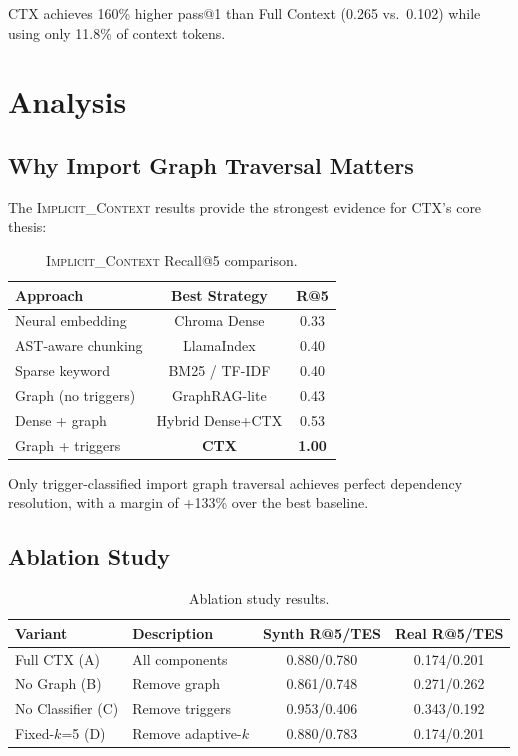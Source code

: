 \documentclass[11pt]{article}
\begin{document}
CTX achieves 160\% higher pass@1 than Full Context (0.265 vs.\ 0.102) while using only 11.8\% of context tokens.

\section{Analysis}

\subsection{Why Import Graph Traversal Matters}

The \textsc{Implicit\_Context} results provide the strongest evidence for CTX's core thesis:

\begin{table}[t]
\centering
\small
\caption{\textsc{Implicit\_Context} Recall@5 comparison.}
\label{tab:implicit}
\begin{tabular}{@{}lcc@{}}
\toprule
\textbf{Approach} & \textbf{Best Strategy} & \textbf{R@5} \\
\midrule
Neural embedding & Chroma Dense & 0.33 \\
AST-aware chunking & LlamaIndex & 0.40 \\
Sparse keyword & BM25 / TF-IDF & 0.40 \\
Graph (no triggers) & GraphRAG-lite & 0.43 \\
Dense + graph & Hybrid Dense+CTX & 0.53 \\
Graph + triggers & \textbf{CTX} & \textbf{1.00} \\
\bottomrule
\end{tabular}
\end{table}

Only trigger-classified import graph traversal achieves perfect dependency resolution, with a margin of +133\% over the best baseline.

\subsection{Ablation Study}
\label{sec:ablation}

\begin{table}[t]
\centering
\small
\caption{Ablation study results.}
\label{tab:ablation}
\begin{tabular}{@{}llcc@{}}
\toprule
\textbf{Variant} & \textbf{Description} & \textbf{Synth R@5/TES} & \textbf{Real R@5/TES} \\
\midrule
Full CTX (A) & All components & 0.880/0.780 & 0.174/0.201 \\
No Graph (B) & Remove graph & 0.861/0.748 & 0.271/0.262 \\
No Classifier (C) & Remove triggers & 0.953/0.406 & 0.343/0.192 \\
Fixed-$k$=5 (D) & Remove adaptive-$k$ & 0.880/0.783 & 0.174/0.201 \\
\bottomrule
\end{tabular}
\end{table}
\end{document}

